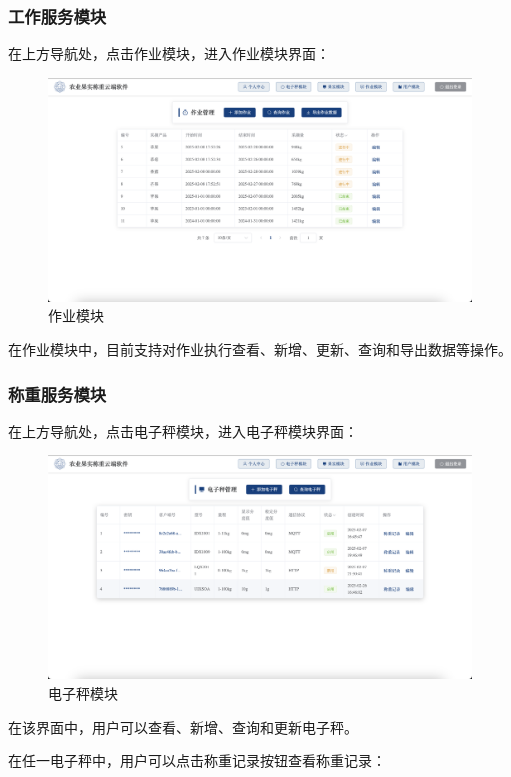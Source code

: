 \documentclass{xduugmr}
\begin{document}
\subsubsection{工作服务模块}

在上方导航处，点击作业模块，进入作业模块界面：

\begin{figure}[H]
    \centering
    \includegraphics[width=0.8\linewidth]{../result/作业模块.png}
    \caption{作业模块}
    \label{fig:作业模块}
\end{figure}

在作业模块中，目前支持对作业执行查看、新增、更新、查询和导出数据等操作。

\subsubsection{称重服务模块}

在上方导航处，点击电子秤模块，进入电子秤模块界面：

\begin{figure}[H]
    \centering
    \includegraphics[width=0.8\linewidth]{../result/电子秤模块.png}
    \caption{电子秤模块}
    \label{fig:电子秤模块}
\end{figure}

在该界面中，用户可以查看、新增、查询和更新电子秤。

在任一电子秤中，用户可以点击称重记录按钮查看称重记录：
\end{document}
